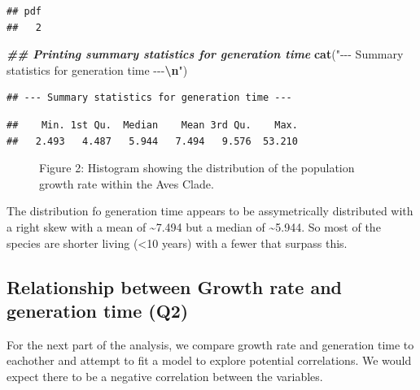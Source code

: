 \documentclass[
]{article}
\newenvironment{Shaded}{\begin{snugshade}}{\end{snugshade}}
\newcommand{\DocumentationTok}[1]{\textcolor[rgb]{0.56,0.35,0.01}{\textbf{\textit{#1}}}}
\newcommand{\FunctionTok}[1]{\textcolor[rgb]{0.13,0.29,0.53}{\textbf{#1}}}
\newcommand{\NormalTok}[1]{#1}
\newcommand{\SpecialCharTok}[1]{\textcolor[rgb]{0.81,0.36,0.00}{\textbf{#1}}}
\newcommand{\StringTok}[1]{\textcolor[rgb]{0.31,0.60,0.02}{#1}}
\begin{document}
\begin{verbatim}
## pdf 
##   2
\end{verbatim}

\begin{Shaded}
\begin{Highlighting}[]
\DocumentationTok{\#\# Printing summary statistics for generation time}
\FunctionTok{cat}\NormalTok{(}\StringTok{"{-}{-}{-} Summary statistics for generation time {-}{-}{-}}\SpecialCharTok{\textbackslash{}n}\StringTok{"}\NormalTok{)}
\end{Highlighting}
\end{Shaded}

\begin{verbatim}
## --- Summary statistics for generation time ---
\end{verbatim}

\begin{Shaded}
\end{Shaded}

\begin{verbatim}
##    Min. 1st Qu.  Median    Mean 3rd Qu.    Max. 
##   2.493   4.487   5.944   7.494   9.576  53.210
\end{verbatim}

\begin{figure}
\centering

\caption{Figure 2: Histogram showing the distribution of the population
growth rate within the Aves Clade.}
\end{figure}

The distribution fo generation time appears to be assymetrically
distributed with a right skew with a mean of \textasciitilde7.494 but a
median of \textasciitilde5.944. So most of the species are shorter
living (\textless10 years) with a fewer that surpass this.

\subsection{Relationship between Growth rate and generation time
(Q2)}\label{relationship-between-growth-rate-and-generation-time-q2}

For the next part of the analysis, we compare growth rate and generation
time to eachother and attempt to fit a model to explore potential
correlations. We would expect there to be a negative correlation between
the variables.
\end{document}
